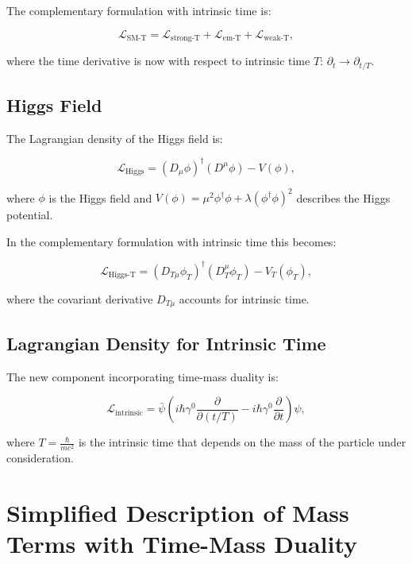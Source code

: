 \documentclass{article}
\begin{document}
	The complementary formulation with intrinsic time is:
	
	\begin{equation}
		\mathcal{L}_\text{SM-T} = \mathcal{L}_\text{strong-T} + \mathcal{L}_\text{em-T} + \mathcal{L}_\text{weak-T},
	\end{equation}
	
	where the time derivative is now with respect to intrinsic time $T$: $\partial_t \rightarrow \partial_{t/T}$.
	
	\subsection{Higgs Field}
	The Lagrangian density of the Higgs field is:
	
	\begin{equation}
		\mathcal{L}_\text{Higgs} = (D_\mu \phi)^\dagger (D^\mu \phi) - V(\phi),
	\end{equation}
	
	where $\phi$ is the Higgs field and $V(\phi) = \mu^2 \phi^\dagger \phi + \lambda (\phi^\dagger \phi)^2$ describes the Higgs potential.
	
	In the complementary formulation with intrinsic time this becomes:
	
	\begin{equation}
		\mathcal{L}_\text{Higgs-T} = (D_{T\mu} \phi_T)^\dagger (D_T^\mu \phi_T) - V_T(\phi_T),
	\end{equation}
	
	where the covariant derivative $D_{T\mu}$ accounts for intrinsic time.
	
	\subsection{Lagrangian Density for Intrinsic Time}
	The new component incorporating time-mass duality is:
	
	\begin{equation}
		\mathcal{L}_\text{intrinsic} = \bar{\psi}\left(i\hbar\gamma^0 \frac{\partial}{\partial (t/T)} - i\hbar\gamma^0 \frac{\partial}{\partial t}\right)\psi,
	\end{equation}
	
	where $T = \frac{\hbar}{mc^2}$ is the intrinsic time that depends on the mass of the particle under consideration.
	
	\section{Simplified Description of Mass Terms with Time-Mass Duality}
	
\end{document}
